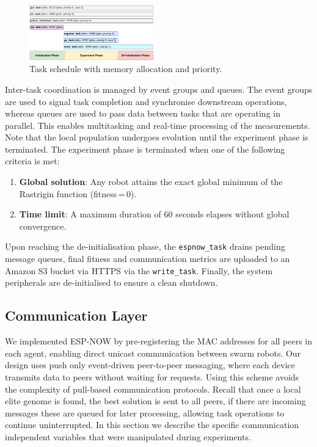 \documentclass[conference]{IEEEtran}
\begin{document}
\begin{figure}[H]
    \centering
    \includegraphics[width=0.48\textwidth]{rtos.png}
    \caption{Task schedule with memory allocation and priority.}
    \label{fig:rtos}
\end{figure}

Inter-task coordination is managed by event groups and queues. The event groups are used to signal task completion and synchronise downstream operations, whereas queues are used to pass data between tasks that are operating in parallel. This enables multitasking and real-time processing of the measurements.\\ 

Note that the local population undergoes evolution until the experiment phase is terminated. The experiment phase is terminated when one of the following criteria is met:

\begin{enumerate}
  \item \textbf{Global solution}: Any robot attains the exact global minimum of the Rastrigin function (fitness\,=\,0).
  \item \textbf{Time limit}: A maximum duration of 60 seconds elapses without global convergence.
\end{enumerate}

Upon reaching the de-initialisation phase, the \texttt{espnow\_task} drains pending message queues, final fitness and communication metrics are uploaded to an Amazon S3 bucket via HTTPS via the \texttt{write\_task}. Finally, the system peripherals are de-initialised to ensure a clean shutdown.

\subsection{Communication Layer}\label{sec:comm-layer}

We implemented ESP-NOW by pre-registering the MAC addresses for all peers in each agent, enabling direct unicast communication between swarm robots. Our design uses push only event-driven peer-to-peer messaging, where each device transmits data to peers without waiting for requests. Using this scheme avoids the complexity of pull-based communication protocols. Recall that once a local elite genome is found, the best solution is sent to all peers, if there are incoming messages these are queued for later processing, allowing task operations to continue uninterrupted. In this section we describe the specific communication independent variables that were manipulated during experiments.\\
\end{document}
